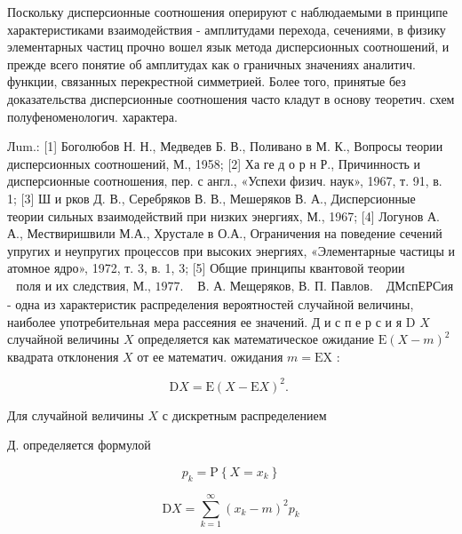 \documentclass[10pt]{article}
\begin{document}
Поскольку дисперсионные соотношения оперируют с наблюдаемыми в принципе характеристиками взаимодействия - амплитудами перехода, сечениями, в физику элементарных частиц прочно вошел язык метода дисперсионных соотношений, и прежде всего понятие об амплитудах как о граничных значениях аналитич. функции, связанных перекрестной симметрией. Более того, принятые без доказательства дисперсионные соотношения часто кладут в основу теоретич. схем полуфеноменологич. характера.



Лum.: [1] Боголюбов Н. Н., Медведев Б. В., Поливано в М. К., Вопросы теории дисперсионных соотношений, М., 1958; [2] Ха ге д о р н Р., Причинность и дисперсионные соотношения, пер. с англ., «Успехи физич. наук», 1967, т. 91, в. 1; [3] Ш и рков Д. В., Серебряков В. В., Мешеряков В. А., Дисперсионные теории сильных взаимодействий при низких энергиях, М., 1967; [4] Логунов А. А., Мествиришвили М.А., Хрустале в О.А., Ограничения на поведение сечений упругих и неупругих процессов при высоких энергиях, «Элементарные частицы и атомное ядро», 1972, т. 3, в. 1, 3; [5] Общие принципы квантовой теории $\begin{array}{ll}\text { поля и их следствия, М., } 1977 . & \text { В. А. Мещеряков, В. П. Павлов. }\end{array}$ ДМспЕРСия - одна из характеристик распределения вероятностей случайной величины, наиболее употребительная мера рассеяния ее значений. Д и с п е р с и я D $X$ случайной величины $X$ определяется как математическое ожидание $\mathrm{E}(X-m)^{2}$ квадрата отклонения $X$ от ее математич. ожидания $m=\mathrm{EX}$ :



\[

\mathrm{D} X=\mathrm{E}(X-\mathrm{E} X)^{2} \text {. }

\]



Для случайной величины $X$ с дискретным распределением



Д. определяется формулой



\[

p_{k}=\mathrm{P}\left\{X=x_{k}\right\}

\]



\[

\mathrm{D} X=\sum_{k=1}^{\infty}\left(x_{k}-m\right)^{2} p_{k}

\]
\end{document}
